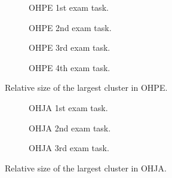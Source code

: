 \newpage

\begin{figure}[ht] 
  \begin{subfigure}[b]{0.5\linewidth}
    \centering
    \setlength\figureheight{3.5cm}
    \setlength\figurewidth{\textwidth}
    
    \caption{OHPE 1st exam task.} 
    \label{fig-sd-clust-size:a} 
    \vspace{4ex}
  \end{subfigure}%
  \begin{subfigure}[b]{0.5\linewidth}
    \centering
    \setlength\figureheight{3.5cm}
    \setlength\figurewidth{\textwidth}
    
    \caption{OHPE 2nd exam task.} 
    \label{fig-sd-clust-size:b} 
    \vspace{4ex}
  \end{subfigure}
   \begin{subfigure}[b]{0.5\linewidth}
    \centering
    \setlength\figureheight{3.5cm}
    \setlength\figurewidth{\textwidth}
    
    \caption{OHPE 3rd exam task.} 
    \label{fig-sd-clust-size:c} 
    \vspace{4ex}
  \end{subfigure}%
  \begin{subfigure}[b]{0.5\linewidth}
    \centering
    \setlength\figureheight{3.5cm}
    \setlength\figurewidth{\textwidth}
    
    \caption{OHPE 4th exam task.} 
    \label{fig-sd-clust-size:d} 
    \vspace{4ex}
  \end{subfigure} 
\caption{Relative size of the largest cluster in OHPE.}
\label{fig-sd-clust-size}
\end{figure}



\begin{figure}[!h] 
  \centering
  \begin{subfigure}[b]{0.5\linewidth}
    \setlength\figureheight{3.5cm}
    \setlength\figurewidth{\textwidth}
    
    \caption{OHJA 1st exam task.} 
    \label{fig-sd-clust-size-ohja:a} 
    \vspace{4ex}
  \end{subfigure}%
  \begin{subfigure}[b]{0.5\linewidth}
    \setlength\figureheight{3.5cm}
    \setlength\figurewidth{\textwidth}
    
    \caption{OHJA 2nd exam task.} 
    \label{fig-sd-clust-size-ohja:b} 
    \vspace{4ex}
  \end{subfigure}
   \begin{subfigure}[b]{0.5\linewidth}
    \setlength\figureheight{3.5cm}
    \setlength\figurewidth{\textwidth}
    
    \caption{OHJA 3rd exam task.} 
    \label{fig-sd-clust-size-ohja:c} 
  \end{subfigure}
\caption{Relative size of the largest cluster in OHJA.}
\label{fig-sd-clust-size-ohja}
\end{figure}

